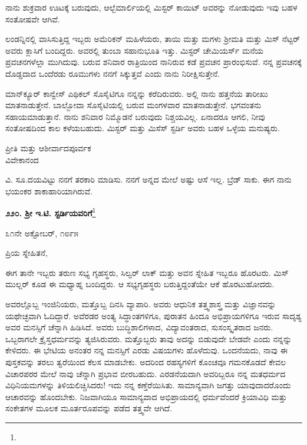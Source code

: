 \vspace{0.1cm}

ನಾನು ಶುಕ್ರವಾರ ಊಟಕ್ಕೆ ಬರುವುದು, ಆಲ್ಬೆಮಾರ್ಲಿಯಲ್ಲಿ ಮಿಸ್ಟರ್ ಕಾಯಿಟ್ ಅವರನ್ನು ನೋಡುವುದು ಇವು ಬಹಳ ಸಂತೋಷವೇ ಆಗಿವೆ.

\vspace{0.1cm}

ಲಂಡನ್ನಿನಲ್ಲಿ ವಾಸಿಸುತ್ತಿದ್ದ ಇಬ್ಬರು ಅಮೆರಿಕನ್‌ ಮಹಿಳೆಯರು, ತಾಯಿ ಮತ್ತು ಮಗಳು ಶ‍್ರೀಮತಿ ಮತ್ತು ಮಿಸ್‌ ನೆಟ್ಟರ್ ಅವರು ಕ್ಲಾಸಿಗೆ ಬಂದಿದ್ದರು. ಅವರಲ್ಲಿ ತುಂಬಾ ಸಹಾನುಭೂತಿ ಇತ್ತು. ಮಿಸ್ಟರ್ ಚೇಮಿಯರ್ಸ್ ಮನೆಯ ಪ್ರವಚನಗಳೆಲ್ಲಾ ಮುಗಿದುವು. ಬರುವ ಶನಿವಾರ ರಾತ್ರಿಯಿಂದ ನಾನಿರುವ ಕಡೆ ಪ್ರವಚನ ಪ್ರಾರಂಭಿಸುವೆ. ನನ್ನ ಪ್ರವಚನಕ್ಕೆ ದೊಡ್ಡದಾದ ಒಂದೆರಡು ರೂಮುಗಳು ನನಗೆ ಸಿಕ್ಕುತ್ತವೆ ಎಂದು ನಾನು ನಿರೀಕ್ಷಿಸುತ್ತೇನೆ.

\vspace{0.1cm}

ಮಾನ್‌ಕ್ಯೂರ್ ಕಾನ್ವೇಸ್ ಎಥಿಕಲ್ ಸೊಸೈಟಿಗೂ ನನ್ನನ್ನು ಕರೆದಿರುವರು. ಅಲ್ಲಿ ನಾನು ಹತ್ತನೆಯ ತಾರೀಖು ಮಾತನಾಡುತ್ತೇನೆ. ಬಾಲ್ಬೋವಾ ಸೊಸೈಟಿಯಲ್ಲಿ ಬರುವ ಮಂಗಳವಾರ ಮಾತನಾಡುತ್ತೇನೆ. ಭಗವಂತನು ಸಹಾಯಮಾಡುತ್ತಾನೆ. ನಾನು ಶನಿವಾರ ನಿಮ್ಮೊಡನೆ ಬರುವುದು ನಿಶ್ಚಯವಿಲ್ಲ. ಏನಾದರೂ ಆಗಲಿ, ನೀವು ಸಂತೋಷದಿಂದ ಕಾಲ ಕಳೆಯಬಹುದು. ಮಿಸ್ಟರ್‌ ಮತ್ತು ಮಿಸೆಸ್ ಸ್ಟರ್ಡಿ ಅವರು ಬಹಳ ಒಳ್ಳೆಯ ಮನುಷ್ಯರು.

\begin{flushright}
ಪ್ರೀತಿ ಮತ್ತು ಆಶೀರ್ವಾದಪೂರ್ವಕ\\ವಿವೇಕಾನಂದ
\end{flushright}

ವಿ. ಸೂ.\enginline{-}ದಯವಿಟ್ಟು ನನಗೆ ತರಕಾರಿ ಮಾಡಿಸು. ನನಗೆ ಅನ್ನದ ಮೇಲೆ ಅಷ್ಟು ಆಸೆ ಇಲ್ಲ. ಬ್ರೆಡ್ ಸಾಕು. ಈಗ ನಾನು ಭಯಂಕರ ಶಾಕಾಹಾರಿಯಾಗಿರುವೆ.

\begin{center}
\textbf{೨೨೦. ಶ‍್ರೀ ಇ.ಟಿ. ಸ್ಟರ್ಡಿಯವರಿಗೆ}\footnote{}
\end{center}

\begin{flushright}
೩೧ನೇ ಅಕ್ಟೋಬರ್, ೧೮೯೫
\end{flushright}

\noindent
ಪ್ರಿಯ ಸ್ನೇಹಿತನೆ,

\vspace{0.1cm}

ಈಗ ತಾನೇ ಇಬ್ಬರು ತರುಣ ಸಭ್ಯ ಗೃಹಸ್ಥರು, ಸಿಲ್ವರ್ ಲಾಕ್ ಮತ್ತು ಅವನ ಸ್ನೇಹಿತ ಇಬ್ಬರೂ ಹೊರಟರು. ಮಿಸ್ ಮುಲ್ಲರ್ ಕೂಡ ಈ ಮಧ್ಯಾಹ್ನ ಬಂದಿದ್ದರು. ಆ ಸಭ್ಯಗೃಹಸ್ಥರು ಬರುತ್ತಿದ್ದಂತೆಯೇ ಆಕೆ ಹೊರಟುಹೋದರು.

\vspace{0.1cm}

ಅವರಲ್ಲೊಬ್ಬ ಇಂಜಿನಿಯರು, ಮತ್ತೊಬ್ಬ ದಿನಸಿ ವ್ಯಾಪಾರಿ. ಅವರು ಆಧುನಿಕ ತತ್ತ್ವಶಾಸ್ತ್ರ ಮತ್ತು ವಿಜ್ಞಾನವನ್ನು ಯಥೇಚ್ಛವಾಗಿ ಓದಿದ್ದಾರೆ. ಅವೆರಡರ ಅಂತ್ಯ ಸಿದ್ಧಾಂತಗಳಿಗೂ, ಪುರಾತನ ಹಿಂದೂ ಅಭಿಪ್ರಾಯಗಳಿಗೂ ಇರುವ ಸಾದೃಶ್ಯ ಅವರ ಮನಸ್ಸಿಗೆ ಚೆನ್ನಾಗಿ ಹಿಡಿಸಿದೆ. ಅವರು ಬುದ್ಧಿಶಾಲಿಗಳಾದ, ವಿದ್ಯಾವಂತರಾದ, ಸುಸಂಸ್ಕೃತರಾದ ಜನರು. ಒಬ್ಬರಾಗಲೇ ಕ್ರೈಸ್ತಧರ್ಮವನ್ನು ತ್ಯಜಿಸಿರುವರು. ಮತ್ತೊಬ್ಬರು ತಾವು ಅದನ್ನು ಬಿಡುವುದೇ ಬೇಡವೇ ಎಂದು ನನ್ನನ್ನು ಕೇಳಿದರು. ಈ ಭೇಟಿಯ ಅನಂತರ ನನ್ನ ಮನಸ್ಸಿಗೆ ಎರಡು ವಿಷಯಗಳು ಹೊಳೆದುವು. ಒಂದನೆಯದು, ನಾವು ಈ ಪುಸ್ತಕವನ್ನು ತರಲು ತ್ವರೆಯಿಂದ ಕೆಲಸ ಮಾಡಬೇಕು. ಅದರಿಂದ ರಹಸ್ಯಗಳಿಗೆ ಕೊಂಚವೂ ಗಮನಕೊಡದೆ ಕೇವಲ ವಿಚಾರಪರರ ಮೇಲೆ ನಾವು ಚೆನ್ನಾಗಿ ಪ್ರಭಾವ ಬೀರಬಹುದು. ಎರಡನೆಯದಾಗಿ ಅವರಿಬ್ಬರೂ ನನ್ನ ಮತಧರ್ಮದ ವಿಧಿನಿಯಮಗಳನ್ನು ತಿಳಿಯಲಿಚ್ಚಿಸಿದರು! ಇದು ನನ್ನ ಕಣ್ತೆರೆಯಿಸಿತು. ಸಾಮಾನ್ಯವಾಗಿ ಜಗತ್ತು ಯಾವುದಾದರೊಂದು ಆಚಾರವನ್ನು ಹೊಂದಬೇಕು. ನಿಜವಾಗಿಯೂ ಸಾಮಾನ್ಯವಾದ ಅಭಿಪ್ರಾಯದಲ್ಲಿ ಧರ್ಮವೆಂದರೆ ಕ್ರಿಯಾವಿಧಿ ಮತ್ತು ಸಂಕೇತಗಳ ಮೂಲಕ ಮೂರ್ತರೂಪವನ್ನು ಪಡೆದ ತತ್ತ್ವವೇ ಆಗಿದೆ.


